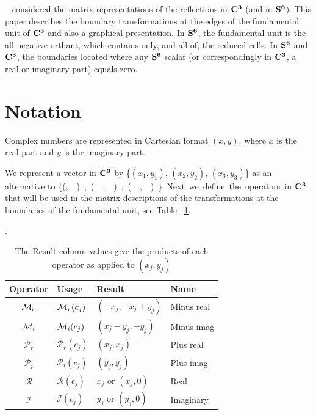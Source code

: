 \documentclass[preprint]{iucr}              %
\numberwithin{equation}{section}
\newcommand{\SVI}[0]{$\bf{S^{6}}$}
\newcommand{\CIII}[0]{$\bf{C^{3}}$}
\newcommand{\Imaginary}[0]{\mathcal{I}}
\newcommand{\Real}[0]{\mathcal{R}}
\begin{document}
	~ considered the matrix representations 
	of the reflections in \CIII{} (and in \SVI{}). 
	This paper describes the boundary transformations 
	at the edges of the fundamental	unit of \CIII{}
	and also a graphical presentation. 
	In \SVI{}, the fundamental unit is the all negative orthant, 
	which contains only, and all of, the reduced cells. 
	In \SVI{} and \CIII{}, 
	the boundaries located where any \SVI{} scalar 
	(or correspondingly in \CIII{}, a real or imaginary part) 
	equals zero. 
	
	
	
	
	\section{Notation}
	
	Complex numbers are represented 
	in Cartesian format $(x,y)$, 
	where $x$ is the real part and
	$y$ is the imaginary part.
	
	We represent a vector 
	in \CIII{} by \{$(x_1,y_1)$, $(x_2,y_2)$, $(x_3, y_3)$\} 
	as an alternative to  \{(\si,\siv ), (\sii,\sv),(\siii,\svi)\}.
	
	Next we define the operators in \CIII{} that 
	will be used in the matrix descriptions of 
	the transformations at the boundaries of the fundamental unit,
	see Table ~\ref{tab:operators}.
	
	\begin{table}	
		\label{tab:operators}
		\caption{The Result column values give the products of each operator as applied to $(x_j, y_j)$}.
		\begin{tabular}{c l l l }
			\toprule
			Operator			&Usage						&Result					&Name\\
			\midrule
			$\mathcal{M}{}_r $		&  $\mathcal{M}{}_r(c_j)$ 		& $(-x_j, -x_j+y_j)$ 	& Minus real \\ 
			$\mathcal{M}{}_i $ 		& $\mathcal{M}{}_i(c_j)$ 		& $(x_j-y_j,-y_j) $ 	& Minus imag\\ 
			$\mathcal{P}_r$ 	& $ \mathcal{P}_r(c_j)$ 	& $(x_j, x_j)$ 		& Plus real\\ 
			$\mathcal{P}_i$ 	&  $\mathcal{P}_i(c_j)$  	& $(y_j, y_j)$ 		& Plus imag\\ 
			$\Real$ 			&  $\Real(c_j)$ 			& $x_j$ or $(x_j,0)$		& Real \\ 
			$\Imaginary$ 		&  $\Imaginary(c_j)$ 		& $y_j$ or $(y_j,0)$ 		& Imaginary\\
			\bottomrule
		\end{tabular}		
	\end{table}
	
\end{document}
